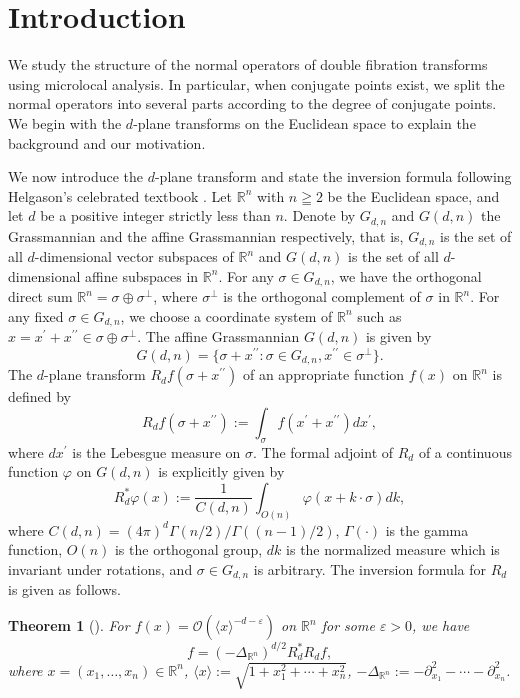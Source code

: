 \documentclass[a4paper,11pt,reqno]{amsart}
\newtheorem{theorem}{Theorem}%
\theoremstyle{definition}
\theoremstyle{remark}
\begin{document}
\section{Introduction}
\label{section:introduction}
%
%
We study the structure of the normal operators of double fibration transforms using microlocal analysis. In particular, when conjugate points exist, we split the normal operators into several parts according to the degree of conjugate points. We begin with the $d$-plane transforms on the Euclidean space to explain the background and our motivation.
%
%
\par
%
%
We now introduce the $d$-plane transform and state the inversion formula following Helgason's celebrated textbook \cite[Chapter~1, Section~6]{Helgason}. Let $\mathbb{R}^n$ with $n\geqq2$ be the Euclidean space, and let $d$ be a positive integer strictly less than $n$. Denote by $G_{d,n}$ and $G(d,n)$ the Grassmannian and the affine Grassmannian respectively, that is, $G_{d,n}$ is the set of all $d$-dimensional vector subspaces of $\mathbb{R}^n$ and $G(d,n)$ is the set of all $d$-dimensional affine subspaces in $\mathbb{R}^n$. For any $\sigma \in G_{d,n}$, we have the orthogonal direct sum 
$\mathbb{R}^n = \sigma\oplus\sigma^\perp$, 
where $\sigma^\perp$ is the orthogonal complement of $\sigma$ in $\mathbb{R}^n$. 
For any fixed $\sigma \in G_{d,n}$, 
we choose a coordinate system of $\mathbb{R}^n$ such as 
$x=x^\prime+x^{\prime\prime} \in \sigma\oplus\sigma^\perp$. 
The affine Grassmannian $G(d,n)$ is given by 
%
%
$$
G(d,n)
=
\{\sigma+x^{\prime\prime}: \sigma \in G_{d,n}, x^{\prime\prime} \in \sigma^\perp\}. 
$$    
%
%
The $d$-plane transform $R_df(\sigma+x^{\prime\prime})$ of an appropriate function $f(x)$ on $\mathbb{R}^n$ is defined by 
%
%
$$
R_df(\sigma+x^{\prime\prime})
:= 
\int_\sigma f(x^\prime+x^{\prime\prime}) dx^\prime,
$$
%
%
where $dx^\prime$ is the Lebesgue measure on $\sigma$. 
The formal adjoint of $R_d$ of a continuous function $\varphi$ on $G(d,n)$ 
is explicitly given by  
%
%
$$
R_d^\ast\varphi(x)
:=
\frac{1}{C(d,n)}
\int_{O(n)}
\varphi(x+k\cdot\sigma)
dk, 
$$
%
%
where $C(d,n)=(4\pi)^d\Gamma(n/2)/\Gamma((n-1)/2)$, 
$\Gamma(\cdot)$ is the gamma function, 
$O(n)$ is the orthogonal group, 
$dk$ is the normalized measure which is invariant under rotations, 
and $\sigma \in G_{d,n}$ is arbitrary. 
The inversion formula for $R_d$ is given as follows.
%
%
\begin{theorem}[{\cite[Chapter~1, Theorem~6.2]{Helgason}}]
\label{theorem:siggi}
For $f(x)=\mathcal{O}(\langle{x}\rangle^{-d-\varepsilon})$ on $\mathbb{R}^n$ for some $\varepsilon>0$, we have 
%
%
$$
f=(-\Delta_{\mathbb{R}^n})^{d/2}R_d^\ast{R_d}f,
$$
%
%
where $x=(x_1,\dotsc,x_n)\in\mathbb{R}^n$, 
$\langle{x}\rangle:=\sqrt{1+x_1^2+\dotsb+x_n^2}$, 
$-\Delta_{\mathbb{R}^n}:=-\partial_{x_1}^2-\dotsb-\partial_{x_n}^2$.  
\end{theorem}
\end{document}
